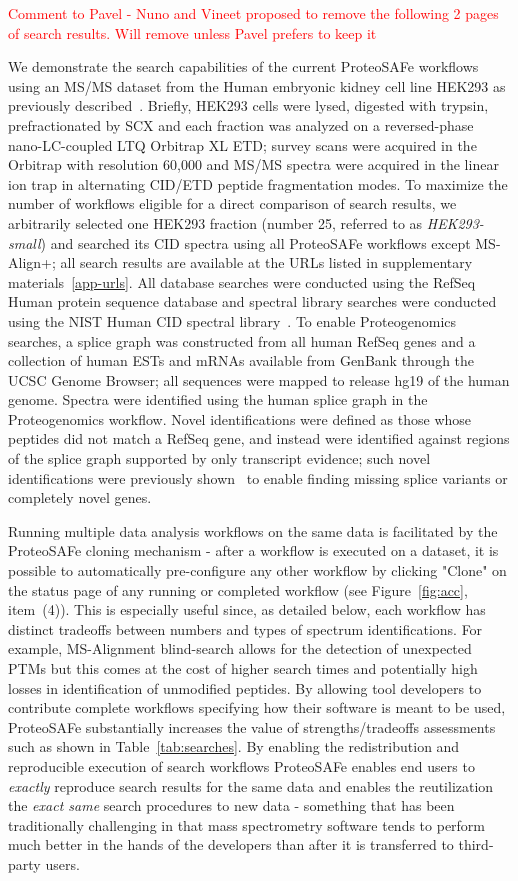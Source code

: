 \documentclass[arial,11pt]{article}
\newcommand{\SF}[1]{\textsf{#1}}
\newcommand{\SYSTEM}[0]{\SF{ProteoSAFe}\xspace}
\newcommand{\NeedRevision}[1]{\textcolor{red}{#1}}
\begin{document}
\NeedRevision{Comment to Pavel - Nuno and Vineet proposed to remove the following 2 pages of search results. Will remove unless Pavel prefers to keep it}

We demonstrate the search capabilities of the current ProteoSAFe workflows using an MS/MS dataset from the Human embryonic kidney cell line HEK293 as previously described~\cite{Kim:2010}. Briefly, HEK293 cells were lysed, digested with trypsin, prefractionated by SCX and each fraction was analyzed on a reversed-phase nano-LC-coupled LTQ Orbitrap XL ETD; survey scans were acquired in the Orbitrap with resolution 60,000 and MS/MS spectra were acquired in the linear ion trap in alternating CID/ETD peptide fragmentation modes. To maximize the number of workflows eligible for a direct comparison of search results, we arbitrarily selected one HEK293 fraction (number 25, referred to as {\em HEK293-small}) and searched its CID spectra using all ProteoSAFe workflows except MS-Align+; all search results are available at the URLs listed in supplementary materials~\ref{app-urls}. All database searches were conducted using the RefSeq Human protein sequence database and spectral library searches were conducted using the NIST Human CID spectral library~\cite{Stein:2010}. To enable Proteogenomics searches, a splice graph was constructed from all human RefSeq genes and a collection of human ESTs and mRNAs available from GenBank through the UCSC Genome Browser; all sequences were mapped to release hg19 of the human genome.  Spectra were identified using the human splice graph in the Proteogenomics workflow. Novel identifications were defined as those whose peptides did not match a RefSeq gene, and instead were identified against regions of the splice graph supported by only transcript evidence; such novel identifications were previously shown~\cite{Castellana:2008} to enable finding missing splice variants or completely novel genes.

Running multiple data analysis workflows on the same data is facilitated by the ProteoSAFe cloning mechanism - after a workflow is executed on a dataset, it is possible to automatically pre-configure any other workflow by clicking "Clone" on the status page of any running or completed workflow (see Figure~\ref{fig:acc}, item~{(4)}).
This is especially useful since, as detailed below, each workflow has distinct tradeoffs between numbers and types of spectrum identifications. For example, MS-Alignment blind-search allows for the detection of unexpected PTMs but this comes at the cost of higher search times and potentially high losses in identification of unmodified peptides. By allowing tool developers to contribute complete workflows specifying how their software is meant to be used, \SYSTEM substantially increases the value of strengths/tradeoffs assessments such as shown in Table~\ref{tab:searches}. By enabling the redistribution and reproducible execution of search workflows \SYSTEM enables end users to {\em exactly} reproduce search results for the same data and enables the reutilization the {\em exact same} search procedures to new data - something that has been traditionally challenging in that mass spectrometry software tends to perform much better in the hands of the developers than after it is transferred to third-party users.
\end{document}
